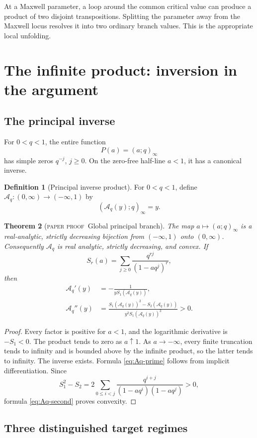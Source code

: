 \documentclass[11pt,oneside]{article}
\newtheorem{theorem}{Theorem}[section]
\theoremstyle{definition}
\newtheorem{definition}[theorem]{Definition}
\theoremstyle{remark}
\theoremstyle{plain}
\theoremstyle{definition}
\theoremstyle{remark}
\newcommand{\Aq}{\mathcal A_q}
\newcommand{\statusproved}{\textcolor{provedgreen}{\textsc{paper proof}}}
\numberwithin{equation}{section}
\numberwithin{figure}{section}
\numberwithin{table}{section}
\let\reporttopsection\section
\let\reportsubsection\subsection
\let\reportsubsubsection\subsubsection
\let\chapter\reporttopsection
\let\section\reportsubsection
\let\subsection\reportsubsubsection
\begin{document}
At a Maxwell parameter, a loop around the common critical value can produce a
product of two disjoint transpositions.  Splitting the parameter away from the
Maxwell locus resolves it into two ordinary branch values.  This is the
appropriate local unfolding.

\chapter{The infinite product: inversion in the argument}

\section{The principal inverse}
For \(0<q<1\), the entire function
\[
 P(a)=(a;q)_\infty
\]
has simple zeros \(q^{-j}\), \(j\ge0\).  On the zero-free half-line
\(a<1\), it has a canonical inverse.

\begin{definition}[Principal inverse product]
For \(0<q<1\), define \(\Aq:(0,\infty)\to(-\infty,1)\) by
\[
 (\Aq(y);q)_\infty=y.
\]
\end{definition}

\begin{theorem}[\statusproved\ Global principal branch]
The map \(a\mapsto(a;q)_\infty\) is a real-analytic, strictly decreasing
bijection from \((-\infty,1)\) onto \((0,\infty)\).  Consequently \(\Aq\) is
real analytic, strictly decreasing, and convex.  If
\[
 S_r(a)=\sum_{j\ge0}\frac{q^{rj}}{(1-aq^j)^r},
\]
then
\begin{align}
 \Aq'(y)&=-\frac1{yS_1(\Aq(y))},\label{eq:Aq-prime}\\
 \Aq''(y)&=
 \frac{S_1(\Aq(y))^2-S_2(\Aq(y))}
 {y^2S_1(\Aq(y))^3}>0.\label{eq:Aq-second}
\end{align}
\end{theorem}
\begin{proof}
Every factor is positive for \(a<1\), and the logarithmic derivative is
\(-S_1<0\).  The product tends to zero as \(a\uparrow1\).  As
\(a\to-\infty\), every finite truncation tends to infinity and is bounded above
by the infinite product, so the latter tends to infinity.  The inverse exists.
Formula \eqref{eq:Aq-prime} follows from implicit differentiation.  Since
\[
 S_1^2-S_2=2\sum_{0\le i<j}\frac{q^{i+j}}
 {(1-aq^i)(1-aq^j)}>0,
\]
formula \eqref{eq:Aq-second} proves convexity.
\end{proof}

\section{Three distinguished target regimes}
\end{document}
